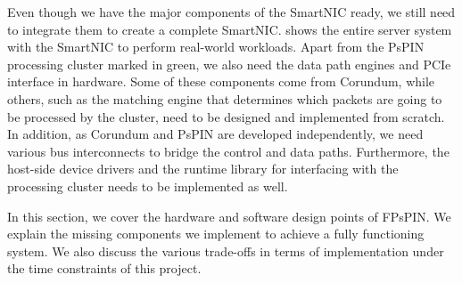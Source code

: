 Even though we have the major components of the SmartNIC ready, we still need to integrate them to create a complete SmartNIC.   shows the entire server system with the SmartNIC to perform real-world workloads.  Apart from the PsPIN processing cluster marked in green, we also need the data path engines and PCIe interface in hardware.  Some of these components come from Corundum, while others, such as the matching engine that determines which packets are going to be processed by the cluster, need to be designed and implemented from scratch.  In addition, as Corundum and PsPIN are developed independently, we need various bus interconnects to bridge the control and data paths.  Furthermore, the host-side device drivers and the runtime library for interfacing with the processing cluster needs to be implemented as well.

In this section, we cover the hardware and software design points of FPsPIN.  We explain the missing components we implement to achieve a fully functioning system.  We also discuss the various trade-offs in terms of implementation under the time constraints of this project.
